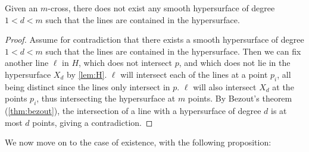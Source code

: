 \begin{lemma}
    Given an $m$-cross, there does not exist any smooth hypersurface of degree $1 < d < m$ such that the lines are contained in the hypersurface.
\end{lemma}
\begin{proof}
    Assume for contradiction that there exists a smooth hypersurface of degree $1 < d < m$ such that the lines are contained in the hypersurface. Then we can fix another line $\ell$ in $H$, which does not intersect $p$, and which does not lie in the hypersurface $X_d$ by \cref{lem:H}. $\ell$ will intersect each of the lines at a point $p_i$, all being distinct since the lines only intersect in $p$. $\ell$ will also intersect $X_d$ at the points $p_i$, thus intersecting the hypersurface at $m$ points. By Bezout's theorem (\cref{thm:bezout}), the intersection of a line with a hypersurface of degree $d$ is at most $d$ points, giving a contradiction. 
\end{proof}

We now move on to the case of existence, with the following proposition:


